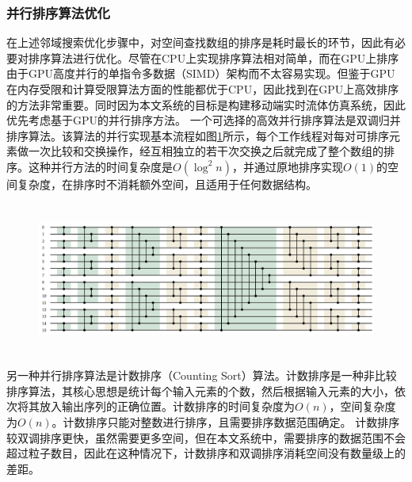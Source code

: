 \subsubsection{并行排序算法优化}
在上述邻域搜索优化步骤中，对空间查找数组的排序是耗时最长的环节，因此有必要对排序算法进行优化。尽管在CPU上实现排序算法相对简单，而在GPU上排序由于GPU高度并行的单指令多数据（SIMD）架构而不太容易实现。但鉴于GPU在内存受限和计算受限算法方面的性能都优于CPU，因此找到在GPU上高效排序的方法非常重要。同时因为本文系统的目标是构建移动端实时流体仿真系统，因此优先考虑基于GPU的并行排序方法。
一个可选择的高效并行排序算法是双调归并排序算法。该算法的并行实现基本流程如图\ref{fig:bitonic}所示，每个工作线程对每对可排序元素做一次比较和交换操作，经互相独立的若干次交换之后就完成了整个数组的排序。这种并行方法的时间复杂度是$O(\log^2 n)$，并通过原地排序实现$O(1)$的空间复杂度，在排序时不消耗额外空间，且适用于任何数据结构。


\begin{figure}[ht]
    \centering
    \includegraphics[height=5cm]{image/bitonicSort.png}
    \label{fig:bitonic}
   \end{figure}

另一种并行排序算法是计数排序（Counting Sort）算法。计数排序是一种非比较排序算法，其核心思想是统计每个输入元素的个数，然后根据输入元素的大小，依次将其放入输出序列的正确位置。计数排序的时间复杂度为$O(n)$，空间复杂度为$O(n)$。计数排序只能对整数进行排序，且需要排序数据范围确定。
计数排序较双调排序更快，虽然需要更多空间，但在本文系统中，需要排序的数据范围不会超过粒子数目，因此在这种情况下，计数排序和双调排序消耗空间没有数量级上的差距。

